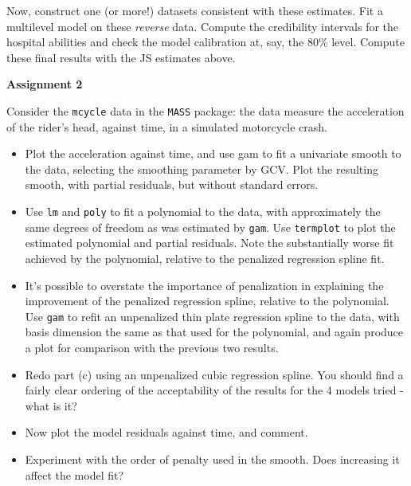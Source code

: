 \begin{itemize}
Now, construct one (or more!) datasets consistent with these estimates. Fit a multilevel model on these \emph{reverse} data.   Compute the credibility intervals for the hospital abilities and check the model calibration at, say, the 80\% level. Compute these final results with the JS estimates above.

\end{itemize}

\vspace{1cm}
\hspace{-0.8cm}
\textbf{Assignment 2}
\vspace{0.5cm}

Consider the \texttt{mcycle} data in the \texttt{MASS} package: the data measure the acceleration of the rider’s head, against time,
in a simulated motorcycle crash.
\begin{itemize}
\item  Plot the acceleration against time, and use gam to fit a univariate smooth to the data, selecting the smoothing parameter by GCV. Plot the resulting smooth, with partial residuals, but without standard errors.
\item Use \texttt{lm} and \texttt{poly} to fit a polynomial to the data, with approximately the same degrees of freedom as was estimated by \texttt{gam}. Use \texttt{termplot} to plot the estimated polynomial and partial residuals. Note the substantially worse fit achieved by the polynomial, relative to the penalized regression spline fit.
\item It's possible to overstate the importance of penalization in explaining the improvement of the penalized regression spline, relative to the polynomial. Use \texttt{gam} to refit an unpenalized thin plate regression spline to the data, with basis dimension the same as that used for the polynomial, and again produce a plot for comparison with the previous two results.
\item Redo part (c) using an unpenalized cubic regression spline. You should find a fairly clear ordering of the acceptability of the results for the 4 models tried - what is it?
\item Now plot the model residuals against time, and comment.
\item Experiment with the order of penalty used in the smooth. Does increasing it affect the model fit?
\end{itemize}










